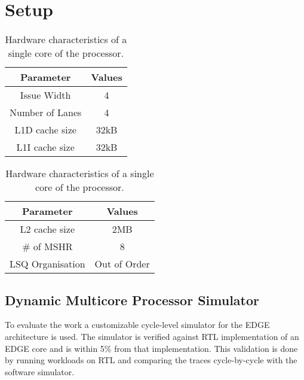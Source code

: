 \chapter{Setup}\label{chp:setup}

\begin{table}[ht]
\begin{minipage}{0.5\textwidth}
\begin{singlespace}
\begin{tabular} { cc }
      \toprule
      \textbf{Parameter} & \textbf{Values} \\ \midrule
	  Issue Width & 4  \\
	  Number of Lanes & 4 \\
      L1D cache size & 32kB \\
      L1I cache size & 32kB \\
	  
	  \end{tabular}
	  \end{singlespace}
\end{minipage}\hfill
\begin{minipage}{0.5\textwidth}
\begin{singlespace}
\begin{tabular} {cc }
      \toprule
      \textbf{Parameter} & \textbf{Values} \\ \midrule
L2 cache size & 2MB \\
	  \# of MSHR & 8 \\
	  LSQ Organisation & Out of Order \\
	  
	  \end{tabular}
	  \end{singlespace}
\end{minipage}
\caption{Hardware characteristics of a single core of the processor.}\label{tab:processor}
\vspace{-3em}
\end{table}

\section{Dynamic Multicore Processor Simulator}\label{chp:setup:conf}

To evaluate the work a customizable cycle-level simulator for the EDGE architecture is used.
The simulator is verified against RTL implementation of an EDGE core and is within 5\% from that implementation.
This validation is done by running workloads on RTL and comparing the traces cycle-by-cycle with the software simulator.

